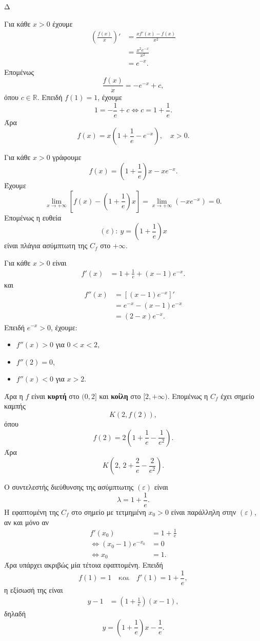 \begin{thema}{Δ}
\begin{erwthma}
\item Για κάθε $x>0$ έχουμε
\begin{align*}
\left(\frac{f(x)}{x}\right)'
&=\frac{xf'(x)-f(x)}{x^2}\\
&=\frac{x^2e^{-x}}{x^2}\\
&=e^{-x}.
\end{align*}
Επομένως
\[
\frac{f(x)}{x}=-e^{-x}+c,
\]
όπου $c\in\mathbb{R}$. Επειδή $f(1)=1$, έχουμε
\[
1=-\frac{1}{e}+c
\Leftrightarrow
c=1+\frac{1}{e}.
\]
Άρα
\[
{f(x)=x\left(1+\frac{1}{e}-e^{-x}\right)},\quad x>0.
\]

\item Για κάθε $x>0$ γράφουμε
\[
f(x)=\left(1+\frac{1}{e}\right)x-xe^{-x}.
\]
Έχουμε
\[
\lim_{x\to+\infty}
\left[
f(x)-\left(1+\frac{1}{e}\right)x
\right]
=\lim_{x\to+\infty}(-xe^{-x})
=0.
\]
Επομένως η ευθεία
\[
{(\varepsilon):\ y=\left(1+\frac{1}{e}\right)x}
\]
είναι πλάγια ασύμπτωτη της $C_f$ στο $+\infty$.

\item Για κάθε $x>0$ είναι
\begin{align*}
f'(x)
&=1+\frac{1}{e}+\left(x-1\right)e^{-x}.
\end{align*}
και
\begin{align*}
f''(x)
&=\left[(x-1)e^{-x}\right]'\\
&=e^{-x}-(x-1)e^{-x}\\
&=(2-x)e^{-x}.
\end{align*}
Επειδή $e^{-x}>0$, έχουμε:
\begin{itemize}
\item $f''(x)>0$ για $0<x<2$,
\item $f''(2)=0$,
\item $f''(x)<0$ για $x>2$.
\end{itemize}
Άρα η $f$ είναι \textbf{κυρτή} στο $(0,2]$ και \textbf{κοίλη} στο $[2,+\infty)$. Επομένως η $C_f$ έχει σημείο καμπής
\[
K\left(2,f(2)\right),
\]
όπου
\[
f(2)=2\left(1+\frac{1}{e}-\frac{1}{e^2}\right).
\]
Άρα
\[
{
K\left(
2,\,
2+\frac{2}{e}-\frac{2}{e^2}
\right)}.
\]

Ο συντελεστής διεύθυνσης της ασύμπτωτης $(\varepsilon)$ είναι
\[
\lambda=1+\frac{1}{e}.
\]
Η εφαπτομένη της $C_f$ στο σημείο με τετμημένη $x_0>0$ είναι παράλληλη στην $(\varepsilon)$, αν και μόνο αν
\begin{align*}
f'(x_0)&=1+\frac{1}{e}\\
\Leftrightarrow
(x_0-1)e^{-x_0}&=0\\
\Leftrightarrow
x_0&=1.
\end{align*}
Άρα υπάρχει ακριβώς μία τέτοια εφαπτομένη. Επειδή
\[
f(1)=1
\quad\text{και}\quad
f'(1)=1+\frac{1}{e},
\]
η εξίσωσή της είναι
\begin{align*}
y-1
&=\left(1+\frac{1}{e}\right)(x-1),
\end{align*}
δηλαδή
\[
{y=\left(1+\frac{1}{e}\right)x-\frac{1}{e}}.
\]


\end{erwthma}
\end{thema}
